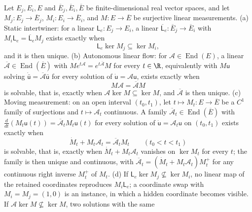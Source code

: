 Let \(E_j,E_i,E\) and \(\overline E_j,\overline E_i,\overline E\) be
finite-dimensional real vector spaces, and let \(M_j:E_j\to\overline E_j\),
\(M_i:E_i\to\overline E_i\), and \(M:E\to\overline E\) be surjective linear
measurements. (a) Static intertwiner: for a linear \(\mathsf L_e:E_j\to E_i\), a
linear \(\overline{\mathsf L}_e:\overline E_j\to\overline E_i\) with
\(M_i\mathsf L_e=\overline{\mathsf L}_eM_j\) exists exactly when
\begin{equation}
\mathsf L_e\ker M_j\subseteq\ker M_i,
\label{eq:geo-selective-descent}
\end{equation}
and it is then unique. (b) Autonomous linear flow: for
\(\mathcal A\in\operatorname{End}(E)\), a linear
\(\overline{\mathcal A}\in\operatorname{End}(\overline E)\) with
\(Me^{t\mathcal A}=e^{t\overline{\mathcal A}}M\) for every \(t\in\R\),
equivalently with \(M\mathsf u\) solving
\(\dot{\bar{\mathsf u}}=\overline{\mathcal A}\bar{\mathsf u}\) for every
solution of \(\dot{\mathsf u}=\mathcal A\mathsf u\), exists exactly when
\begin{equation}
M\mathcal A=\overline{\mathcal A}M
\label{eq:geo-selective-flow-descent}
\end{equation}
is solvable, that is, exactly when \(\mathcal A\ker M\subseteq\ker M\), and
\(\overline{\mathcal A}\) is then unique. (c) Moving measurement: on an open
interval \((t_0,t_1)\), let \(t\mapsto M_t:E\to\overline E\) be a \(C^1\)
family of surjections and \(t\mapsto\mathcal A_t\) continuous. A family
\(\overline{\mathcal A}_t\in\operatorname{End}(\overline E)\) with
\(\tfrac{d}{dt}(M_t\mathsf u(t))=\overline{\mathcal A}_tM_t\mathsf u(t)\) for
every solution of \(\dot{\mathsf u}=\mathcal A_t\mathsf u\) on \((t_0,t_1)\)
exists exactly when
\begin{equation}
\dot M_t+M_t\mathcal A_t=\overline{\mathcal A}_tM_t
\qquad(t_0<t<t_1)
\label{eq:geo-selective-moving-descent}
\end{equation}
is solvable, that is, exactly when \(\dot M_t+M_t\mathcal A_t\) vanishes on
\(\ker M_t\) for every \(t\); the family is then unique and continuous, with
\(\overline{\mathcal A}_t=(\dot M_t+M_t\mathcal A_t)M_t^+\) for any continuous
right inverse \(M_t^+\) of \(M_t\). (d) If
\(\mathsf L_e\ker M_j\not\subseteq\ker M_i\), no linear map of the retained
coordinates reproduces \(M_i\mathsf L_e\); a coordinate swap with
\(M_i=M_j=(1,0)\) is an instance, in which a hidden coordinate becomes visible.
If \(\mathcal A\ker M\not\subseteq\ker M\), two solutions with the same
